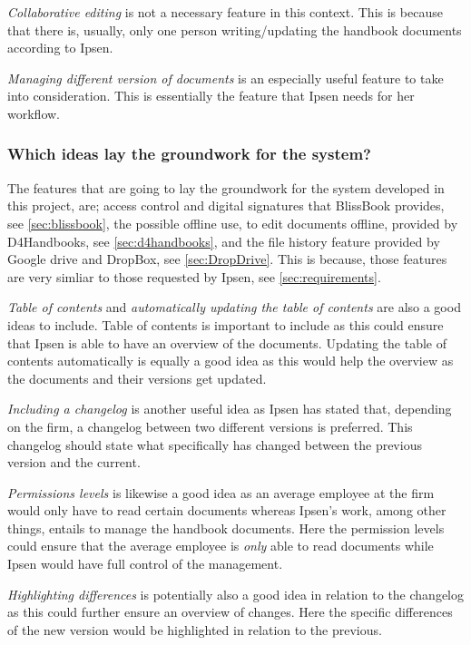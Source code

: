 \textit{Collaborative editing} is not a necessary feature in this context.
This is because that there is, usually, only one person writing/updating the handbook documents according to Ipsen.

\textit{Managing different version of documents} is an especially useful feature to take into consideration.
This is essentially the feature that Ipsen needs for her workflow.

\subsubsection*{Which ideas lay the groundwork for the system?}
The features that are going to lay the groundwork for the system developed in this project, are; access control and digital signatures that BlissBook provides, see \cref{sec:blissbook}, the possible offline use, to edit documents offline, provided by D4Handbooks, see \cref{sec:d4handbooks}, and the file history feature provided by Google drive and DropBox, see \cref{sec:DropDrive}.
This is because, those features are very simliar to those requested by Ipsen, see \cref{sec:requirements}.

\textit{Table of contents} and \textit{automatically updating the table of contents} are also a good ideas to include.
Table of contents is important to include as this could ensure that Ipsen is able to have an overview of the documents.
Updating the table of contents automatically is equally a good idea as this would help the overview as the documents and their versions get updated.

\textit{Including a changelog} is another useful idea as Ipsen has stated that, depending on the firm, a changelog between two different versions is preferred.
This changelog should state what specifically has changed between the previous version and the current.

\textit{Permissions levels} is likewise a good idea as an average employee at the firm would only have to read certain documents whereas Ipsen's work, among other things, entails to manage the handbook documents.
Here the permission levels could ensure that the average employee is \textit{only} able to read documents while Ipsen would have full control of the management.

\textit{Highlighting differences} is potentially also a good idea in relation to the changelog as this could further ensure an overview of changes.
Here the specific differences of the new version would be highlighted in relation to the previous.

